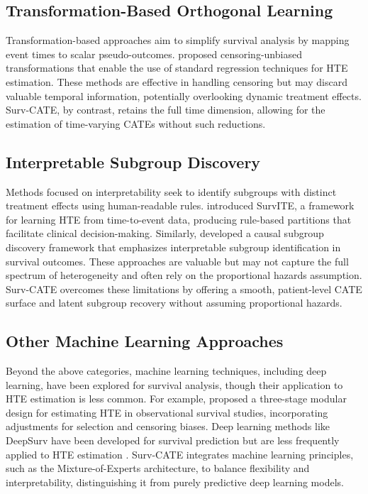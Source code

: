 \documentclass{article}
\begin{document}
\subsection{Transformation-Based Orthogonal Learning}

Transformation-based approaches aim to simplify survival analysis by mapping event times to scalar pseudo-outcomes. \citet{xu2024estimating} proposed censoring-unbiased transformations that enable the use of standard regression techniques for HTE estimation. These methods are effective in handling censoring but may discard valuable temporal information, potentially overlooking dynamic treatment effects. Surv-CATE, by contrast, retains the full time dimension, allowing for the estimation of time-varying CATEs without such reductions.

\subsection{Interpretable Subgroup Discovery}

Methods focused on interpretability seek to identify subgroups with distinct treatment effects using human-readable rules. \citet{curth2021survite} introduced SurvITE, a framework for learning HTE from time-to-event data, producing rule-based partitions that facilitate clinical decision-making. Similarly, \citet{bo2024estimating} developed a causal subgroup discovery framework that emphasizes interpretable subgroup identification in survival outcomes. These approaches are valuable but may not capture the full spectrum of heterogeneity and often rely on the proportional hazards assumption. Surv-CATE overcomes these limitations by offering a smooth, patient-level CATE surface and latent subgroup recovery without assuming proportional hazards.

\subsection{Other Machine Learning Approaches}

Beyond the above categories, machine learning techniques, including deep learning, have been explored for survival analysis, though their application to HTE estimation is less common. For example, \citet{zhu2020targeted} proposed a three-stage modular design for estimating HTE in observational survival studies, incorporating adjustments for selection and censoring biases. Deep learning methods like DeepSurv have been developed for survival prediction but are less frequently applied to HTE estimation \citep{katzman2018deepsurv}. Surv-CATE integrates machine learning principles, such as the Mixture-of-Experts architecture, to balance flexibility and interpretability, distinguishing it from purely predictive deep learning models.
\end{document}
